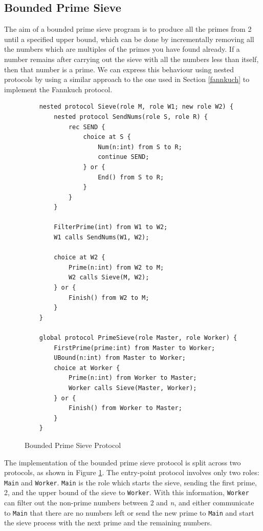 \documentclass[12pt,twoside]{report}
\begin{document}
\subsection{Bounded Prime Sieve}\label{primesieve}
The aim of a bounded prime sieve program is to produce all the primes from 2 until a specified upper bound, which can be done by incrementally removing all the numbers which are multiples of the primes you have found already. If a number remains after carrying out the sieve with all the numbers less than itself, then that number is a prime. We can express this behaviour using nested protocols by using a similar approach to the one used in Section \ref{fannkuch} to implement the Fannkuch protocol.\\


\begin{figure}[htb!]
    \centering
    \lstset{language=Scribble}
    \begin{lstlisting}
    nested protocol Sieve(role M, role W1; new role W2) {
        nested protocol SendNums(role S, role R) {
            rec SEND {
                choice at S {
                    Num(n:int) from S to R;
                    continue SEND;
                } or {
                    End() from S to R;
                }
            }
        }
    
        FilterPrime(int) from W1 to W2;
        W1 calls SendNums(W1, W2);
    
        choice at W2 {
            Prime(n:int) from W2 to M;
            W2 calls Sieve(M, W2);
        } or {
            Finish() from W2 to M;
        }
    }
    
    global protocol PrimeSieve(role Master, role Worker) {
        FirstPrime(prime:int) from Master to Worker;
        UBound(n:int) from Master to Worker;
        choice at Worker {
            Prime(n:int) from Worker to Master;
            Worker calls Sieve(Master, Worker);
        } or {
            Finish() from Worker to Master;
        }
    }
    \end{lstlisting}
    \caption{Bounded Prime Sieve Protocol}
    \label{primesieve-protocol}
\end{figure}

The implementation of the bounded prime sieve protocol is split across two protocols, as shown in Figure \ref{primesieve-protocol}. The entry-point protocol involves only two roles: \texttt{Main} and \texttt{Worker}. \texttt{Main} is the role which starts the sieve, sending the first prime, 2,  and the upper bound of the sieve to \texttt{Worker}. With this information, \texttt{Worker} can filter out the non-prime numbers between 2 and \textit{n}, and either communicate to \texttt{Main} that there are no numbers left or send the new prime to \texttt{Main} and start the sieve process with the next prime and the remaining numbers. \\
\end{document}
